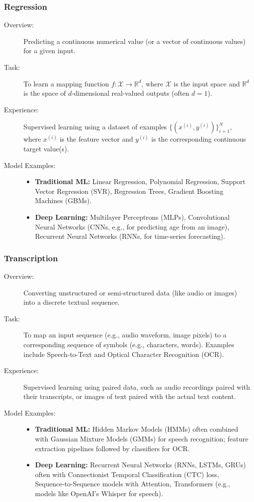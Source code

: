 \documentclass{article}
\begin{document}
\subsubsection{Regression}
\begin{description}
    \item[Overview:] Predicting a continuous numerical value (or a vector of continuous values) for a given input.
    \item[Task:] To learn a mapping function $f: \mathcal{X} \rightarrow \mathbb{R}^d$, where $\mathcal{X}$ is the input space and $\mathbb{R}^d$ is the space of $d$-dimensional real-valued outputs (often $d=1$).
    \item[Experience:] Supervised learning using a dataset of examples $\{(x^{(i)}, y^{(i)})\}_{i=1}^N$, where $x^{(i)}$ is the feature vector and $y^{(i)}$ is the corresponding continuous target value(s).
    \item[Model Examples:]
        \begin{itemize}
            \item \textbf{Traditional ML:} Linear Regression, Polynomial Regression, Support Vector Regression (SVR), Regression Trees, Gradient Boosting Machines (GBMs).
            \item \textbf{Deep Learning:} Multilayer Perceptrons (MLPs), Convolutional Neural Networks (CNNs, e.g., for predicting age from an image), Recurrent Neural Networks (RNNs, for time-series forecasting).
        \end{itemize}
\end{description}

\subsubsection{Transcription}
\begin{description}
    \item[Overview:] Converting unstructured or semi-structured data (like audio or images) into a discrete textual sequence.
    \item[Task:] To map an input sequence (e.g., audio waveform, image pixels) to a corresponding sequence of symbols (e.g., characters, words). Examples include Speech-to-Text and Optical Character Recognition (OCR).
    \item[Experience:] Supervised learning using paired data, such as audio recordings paired with their transcripts, or images of text paired with the actual text content.
    \item[Model Examples:]
        \begin{itemize}
            \item \textbf{Traditional ML:} Hidden Markov Models (HMMs) often combined with Gaussian Mixture Models (GMMs) for speech recognition; feature extraction pipelines followed by classifiers for OCR.
            \item \textbf{Deep Learning:} Recurrent Neural Networks (RNNs, LSTMs, GRUs) often with Connectionist Temporal Classification (CTC) loss, Sequence-to-Sequence models with Attention, Transformers (e.g., models like OpenAI's Whisper for speech).
        \end{itemize}
\end{description}
\end{document}
